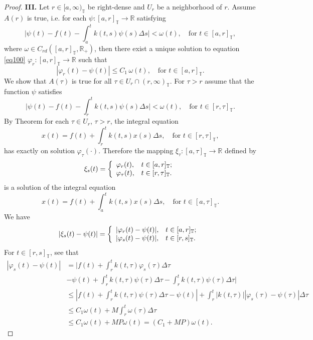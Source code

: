 \documentclass{article}
\newcommand{\q}{\quad}
\begin{document}
\begin{proof}
\textbf{III.} Let $r\in [a,\infty)_\mathbb{T}$ be right-dense and $U_r$ be a neighborhood of $r$. Assume $A(r)$ is true, i.e. for each $\psi:[a,r]_{\mathbb{T}}\rightarrow \mathbb{R}$ satisfying
$$
\Big|\psi(t)-f(t)-\int_a^tk(t,s)\psi(s)\Delta s\Big|<\omega(t), \q \text{for } t \in [a,r]_\mathbb{T},
$$
where $\omega\in C_{rd}([a,r]_\mathbb{T},\mathbb{R}_+)$, then there exist a unique solution to equation \eqref{eq100} $\varphi_r:[a,r]_{\mathbb{T}}\rightarrow \mathbb{R}$ such that
$$
|\varphi_r(t)-\psi(t)|\leq C_1\,\omega(t),\q \text{for } t \in [a,r]_\mathbb{T}.
$$
We show that $A(\tau)$ is true for all $\tau\in U_r\cap (r,\infty)_{\mathbb{T}}$. For $\tau>r$ assume that the function $\psi$ satisfies
$$
\Big|\psi(t)-f(t)-\int_r^tk(t,s)\psi(s)\Delta s\Big|<\omega(t), \q \text{for  } t \in [r,\tau]_{\mathbb{T}}.
$$
By Theorem for each $\tau\in U_r$, $\tau>r$, the integral equation
$$
x(t)=f(t)+\int_r^tk(t,s)x(s)\Delta s, \q \text{for } t\in [r,\tau]_{\mathbb{T}},
$$
has exactly on solution $\varphi_\tau(\cdot)$.  Therefore the mapping $\xi_\tau:[a,\tau]_{\mathbb{T}}\rightarrow \mathbb{R}$ defined by
\begin{equation*}
  \xi_s(t)=
   \left\{
     \begin{array}{ll}
       \varphi_r(t), & \hbox{$t\in[a,r]_\mathbb{T}$;} \\
       \varphi_\tau(t), & \hbox{$t\in[r,\tau]_\mathbb{T}$.}
     \end{array}
   \right.
\end{equation*}
is a solution of the integral equation
$$
x(t)=f(t)+\int_a^tk(t,s)x(s)\Delta s, \q \text{for } t\in [a,\tau]_{\mathbb{T}}.
$$
We have
  \begin{equation*}
  |\xi_s(t)-\psi(t)|=
   \left\{
     \begin{array}{ll}
       |\varphi_r(t)-\psi(t)|, & \hbox{$t\in[a,r]_{\mathbb{T}}$;} \\
       |\varphi_s(t)-\psi(t)|, & \hbox{$t\in[r,s]_{\mathbb{T}}$.}
     \end{array}
   \right.\\
  \end{equation*}
For $t\in [r,s]_\mathbb{T}$, see that
\begin{align*}
  |\varphi_s(t)-\psi(t)| &= \Big|f(t)+\int_r^tk(t,\tau)\varphi_s(\tau)\Delta \tau \\
    & -\psi(t)+\int_r^tk(t,\tau)\psi(\tau)\Delta \tau-\int_r^tk(t,\tau)\psi(\tau)\Delta \tau\Big|\\
    &\leq |f(t)+\int_r^tk(t,\tau)\psi(\tau)\Delta \tau-\psi(t)|+\int_r^t|k(t,\tau)||\varphi_s(\tau)-\psi(\tau)|\Delta\tau\\
    &\leq  C_1\omega(t)+M\int_r^t\omega(\tau)\Delta\tau\\
    &\leq  C_1\omega(t)+MP\omega(t)=(C_1+MP)\omega(t).
\end{align*}


\end{proof}
\end{document}
